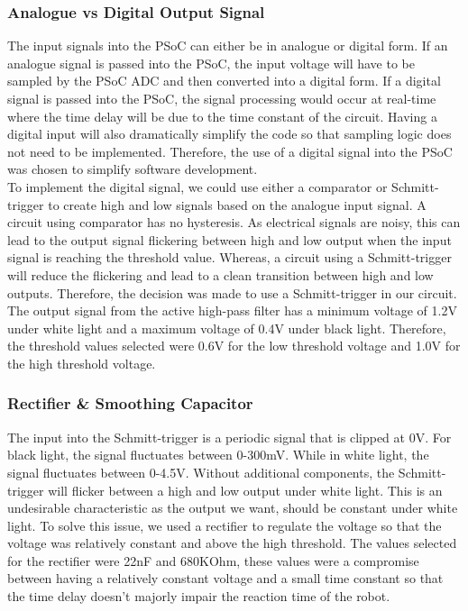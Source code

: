 \subsubsection*{Analogue vs Digital Output Signal}
The input signals into the PSoC can either be in analogue or digital form. If an analogue signal is passed into the PSoC,  the input voltage will have to be sampled by the PSoC ADC and then converted into a digital form. If a digital signal is passed into the PSoC, the signal processing would occur at real-time where the time delay will be due to the time constant of the circuit. Having a digital input will also dramatically simplify the code so that sampling logic does not need to be implemented. Therefore, the use of a digital signal into the PSoC was chosen to simplify software development. 
\\To implement the digital signal, we could use either a comparator or Schmitt-trigger to create high and low signals based on the analogue input signal.  A circuit using comparator has no hysteresis. As electrical signals are noisy, this can lead to the output signal flickering between high and low output when the input signal is reaching the threshold value. Whereas, a circuit using a Schmitt-trigger will reduce the flickering and lead to a clean transition between high and low outputs. Therefore, the decision was made to use a Schmitt-trigger in our circuit. The output signal from the active high-pass filter has a minimum voltage of 1.2V under white light and a maximum voltage of 0.4V under black light. Therefore, the threshold values selected were 0.6V for the low threshold voltage and 1.0V for the high threshold voltage.

\subsubsection*{Rectifier \& Smoothing Capacitor}
The input into the Schmitt-trigger is a periodic signal that is clipped at 0V. For black light, the signal fluctuates between  0-300mV. While in white light, the signal fluctuates between 0-4.5V. Without additional components, the Schmitt-trigger will flicker between a high and low output under white light. This is an undesirable characteristic as the output we want, should be constant under white light. To solve this issue, we used a rectifier to regulate the voltage so that the voltage was relatively constant and above the high threshold. The values selected for the rectifier were 22nF and 680KOhm, these values were a compromise between having a relatively constant voltage and a small time constant so that the time delay doesn’t majorly impair the reaction time of the robot.
